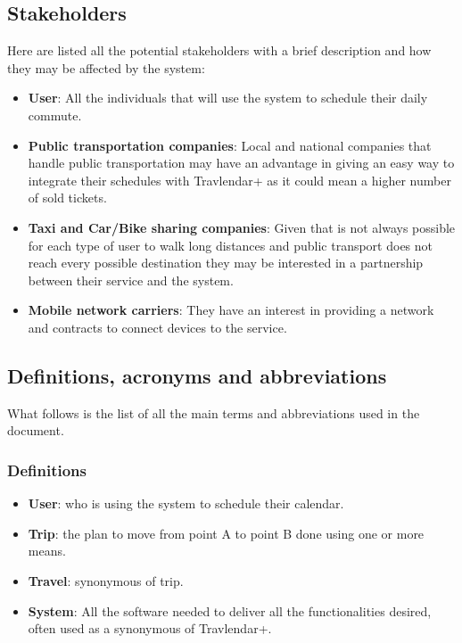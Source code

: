 \subsection{Stakeholders}
Here are listed all the potential stakeholders with a brief description and how they may be affected by the system:
\begin{itemize}
\item \textbf{User}: All the individuals that will use the system to schedule their daily commute.
\item \textbf{Public transportation companies}: Local and national companies that handle public transportation may have an advantage in giving an easy way to integrate their schedules with Travlendar+ as it could mean a higher number of sold tickets.
\item \textbf{Taxi and Car/Bike sharing companies}: Given that is not always possible for each type of user to walk long distances and public transport does not reach every possible destination they may be interested in a partnership between their service and the system.
\item \textbf{Mobile network carriers}: They have an interest in providing a network and contracts to connect devices to the service.
\end{itemize}
\newpage
\subsection{Definitions, acronyms and abbreviations}
What follows is the list of all the main terms and abbreviations used in the document.
\subsubsection{Definitions}
\begin{itemize}
\item \textbf{User}: who is using the system to schedule their calendar.
\item \textbf{Trip}: the plan to move from point A to point B done using one or more means.
\item \textbf{Travel}: synonymous of trip.
\item \textbf{System}: All the software needed to deliver all the functionalities desired, often used as a synonymous of Travlendar+.
\end{itemize}
